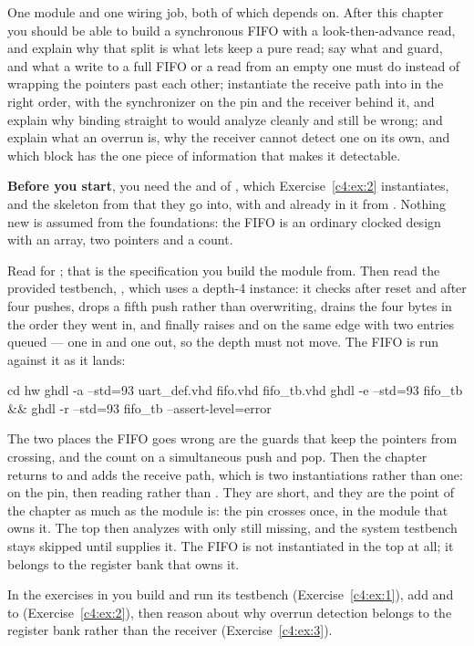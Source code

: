 One module and one wiring job, both of which  depends on. After this chapter you should
be able to build a synchronous FIFO with a look-then-advance read, and explain why that split is
what lets  keep  a pure read; say what  and  guard,
and what a write to a full FIFO or a read from an empty one must do instead of wrapping the pointers
past each other; instantiate the receive path into  in the right order, with the
synchronizer on the pin and the receiver behind it, and explain why binding  straight to
 would analyze cleanly and still be wrong; and explain what an overrun is, why the
receiver cannot detect one on its own, and which block has the one piece of information that makes
it detectable.

\textbf{Before you start}, you need the  and  of , which
Exercise~\ref{c4:ex:2} instantiates, and the  skeleton from  that they go
into, with  and  already in it from . Nothing new is assumed
from the foundations: the FIFO is an ordinary clocked design with an array, two pointers and a
count.

Read  for ; that is the specification you build the module from. Then
read the provided testbench, , which uses a depth-4 instance: it checks
 after reset and  after four pushes, drops a fifth push rather than
overwriting, drains the four bytes in the order they went in, and finally raises  and
 on the same edge with two entries queued --- one in and one out, so the depth must not
move. The FIFO is run against it as it lands:

\begin{shell}
cd hw
ghdl -a --std=93 uart_def.vhd fifo.vhd fifo_tb.vhd
ghdl -e --std=93 fifo_tb && ghdl -r --std=93 fifo_tb --assert-level=error
\end{shell}

\noindent The two places the FIFO goes wrong are the guards that keep the pointers from crossing,
and the count on a simultaneous push and pop. Then the chapter returns to  and adds
the receive path, which is two instantiations rather than one:  on the  pin,
then  reading  rather than . They are short, and they are the
point of the chapter as much as the module is: the pin crosses once, in the module that owns it. The
top then analyzes with only  still missing, and the system testbench stays skipped
until  supplies it. The FIFO is not instantiated in the top at all; it belongs to the
register bank that owns it.

In the exercises in  you build  and run its testbench
(Exercise~\ref{c4:ex:1}), add  and  to 
(Exercise~\ref{c4:ex:2}), then reason about why overrun detection belongs to the register bank
rather than the receiver (Exercise~\ref{c4:ex:3}).




